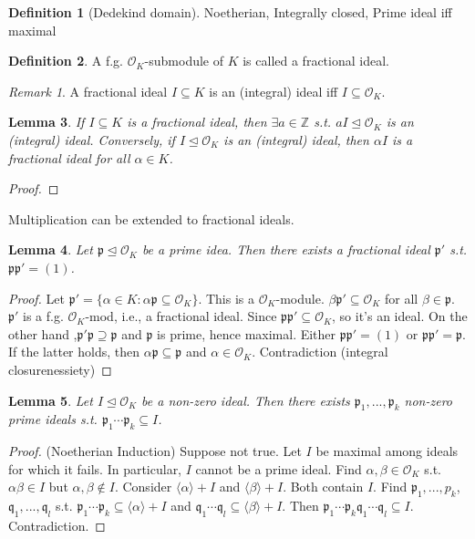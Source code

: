 \documentclass{article}
\theoremstyle{definition}
\newtheorem{defn}{Definition}[section]
\theoremstyle{remark}
\newtheorem{rem}{Remark}
\theoremstyle{plain}
\newtheorem{lem}[defn]{Lemma}
\newcommand{\ZZ}{\mathbb{Z}}
\begin{document}
\begin{defn}[Dedekind domain]
    Noetherian, Integrally closed, Prime ideal iff maximal
\end{defn}
\begin{defn}
    A f.g. $\mathcal O_K$-submodule of $K$ is called a fractional ideal.
\end{defn}
\begin{rem}
    A fractional ideal $I\subseteq K$ is an (integral) ideal iff $I\subseteq \mathcal O_K$.
\end{rem}
\begin{lem}
    If $I\subseteq K$ is a fractional ideal, then $\exists a\in\ZZ$ s.t. $aI\trianglelefteq \mathcal O_K$ is an (integral) ideal. Conversely, if $I\trianglelefteq \mathcal O_K$ is an (integral) ideal, then $\alpha I$ is a fractional ideal for all $\alpha\in K$.
\end{lem}
\begin{proof}
    
\end{proof}
Multiplication can be extended to fractional ideals.
\begin{lem}
    Let $\mathfrak p\trianglelefteq\mathcal O_K$ be a prime idea. Then there exists a fractional ideal $\mathfrak p'$ s.t. $\mathfrak p\mathfrak p'=(1)$.
\end{lem}
\begin{proof}
    Let $\mathfrak p'=\{\alpha\in K:\alpha\mathfrak p\subseteq \mathcal O_K\}$. This is a $\mathcal O_K$-module. $\beta \mathfrak p'\subseteq\mathcal O_K$ for all $\beta\in\mathfrak p$. $\mathfrak p'$ is a f.g. $\mathcal O_K$-mod, i.e., a fractional ideal. Since $\mathfrak p\mathfrak p'\subseteq\mathcal O_K$, so it's an ideal. On the other hand ,$\mathfrak p'\mathfrak p\supseteq \mathfrak p$ and $\mathfrak p$ is prime, hence maximal. Either $\mathfrak p\mathfrak p'=(1)$ or $\mathfrak p\mathfrak p'=\mathfrak p$. If the latter holds, then $\alpha\mathfrak p\subseteq \mathfrak p$ and $\alpha\in\mathcal O_K$. Contradiction (integral closurenessiety)
\end{proof}
\begin{lem}
    Let $I\trianglelefteq \mathcal O_K$ be a non-zero ideal. Then there exists $\mathfrak p_1,...,\mathfrak p_k$ non-zero prime ideals s.t. $\mathfrak p_1\cdots\mathfrak p_k\subseteq I$. 
\end{lem}
\begin{proof}(Noetherian Induction) Suppose not true. Let $I$ be maximal among ideals for which it fails. In particular, $I$ cannot be a prime ideal. Find $\alpha,\beta\in\mathcal O_K$ s.t. $\alpha\beta\in I$ but $\alpha,\beta\notin I$. Consider $\langle\alpha\rangle+I$ and $\langle\beta\rangle+I$. Both contain $I$. Find $\mathfrak p_1,...,p_k$, $\mathfrak q_1,...,\mathfrak q_l$ s.t. $\mathfrak p_1\cdots\mathfrak p_k\subseteq\langle\alpha\rangle +I$ and $\mathfrak q_1\cdots\mathfrak q_l\subseteq\langle\beta\rangle+I$. Then $\mathfrak p_1\cdots\mathfrak p_k\mathfrak q_1\cdots\mathfrak q_l\subseteq I$. Contradiction.
\end{proof}
\end{document}
